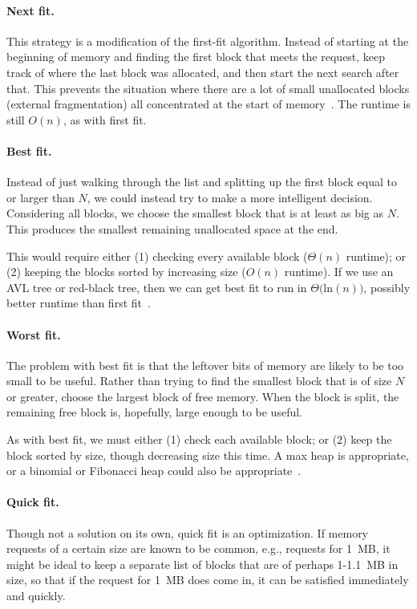 \paragraph{Next fit.} This strategy is a modification of the first-fit algorithm. Instead of starting at the beginning of memory and finding the first block that meets the request, keep track of where the last block was allocated, and then start the next search after that. This prevents the situation where there are a lot of small unallocated blocks (external fragmentation) all concentrated at the start of memory~\cite{mte241}. The runtime is still $O(n)$, as with first fit.

\paragraph{Best fit.}
Instead of just walking through the list and splitting up the first block equal to or larger than $N$, we could instead try to make a more intelligent decision. Considering all blocks, we choose the smallest block that is at least as big as $N$. This produces the smallest remaining unallocated space at the end. 

This would require either (1) checking every available block ($\Theta(n)$ runtime); or (2) keeping the blocks sorted by increasing size ($O(n)$ runtime). If we use an AVL tree or red-black tree, then we can get best fit to run in $\Theta($ln$(n))$, possibly better runtime than first fit~\cite{mte241}.


\paragraph{Worst fit.}
The problem with best fit is that the leftover bits of memory are likely to be too small to be useful. Rather than trying to find the smallest block that is of size $N$ or greater, choose the largest block of free memory. When the block is split, the remaining free block is, hopefully, large enough to be useful. 

As with best fit, we must either (1) check each available block; or (2) keep the block sorted by size, though decreasing size this time. A max heap is appropriate, or a binomial or Fibonacci heap could also be appropriate~\cite{mte241}.

\paragraph{Quick fit.}
Though not a solution on its own, quick fit is an optimization. If memory requests of a certain size are known to be common, e.g., requests for 1~MB, it might be ideal to keep a separate list of blocks that are of perhaps 1-1.1~MB in size, so that if the request for 1~MB does come in, it can be satisfied immediately and quickly. 



